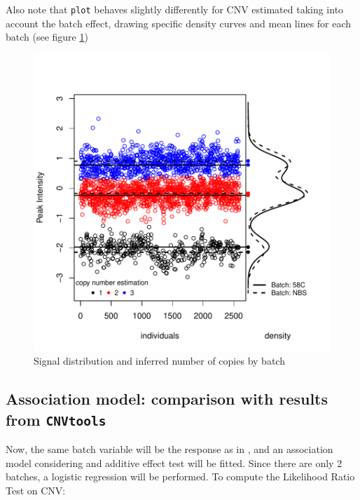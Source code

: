 \documentclass[11pt]{article}
\begin{document}
Also note that \texttt{plot} behaves slightly differently for CNV estimated taking into account the batch effect, drawing specific density
curves and mean lines for each batch (see figure \ref{fig-MLPAcnvbatch})\\


\begin{figure}[ht]
\begin{center}
\includegraphics{CNVassoc_vignette-056}
\caption{\small Signal distribution and inferred number of copies by batch}
\label{fig-MLPAcnvbatch}
\end{center}
\end{figure}


\clearpage


\subsection{Association model: comparison with results from \texttt{CNVtools}}

Now, the same batch variable will be the response as in \cite{CNVtools-vignette}, and 
an association model considering and additive effect test will be fitted. Since there are only 2 batches, a logistic 
regression will be performed. To compute the Likelihood Ratio Test on CNV:
\end{document}
